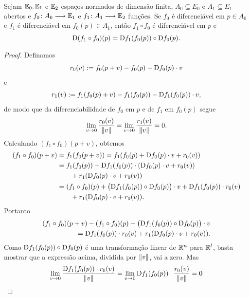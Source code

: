 \begin{prop}
Sejam $\mathbb{E}_0, \mathbb{E}_1$ e $\mathbb{E}_2$ espaços normados de dimensão finita, $A_0 \subseteq E_0$ e $A_1 \subseteq E_1$ abertos e $f_0\colon A_0 \longrightarrow \mathbb{E}_1$ e $f_1\colon A_1 \longrightarrow \mathbb{E}_2$ funções. Se $f_0$ é diferenciável em $p \in A_0$ e $f_1$ é diferenciável em $f_0(p) \in A_1$, então $f_1 \circ f_0$ é diferenciável em $p$ e
	\begin{equation*}
	\mathrm{D} (f_1 \circ f_0)(p) = \mathrm{D} f_1(f_0(p)) \circ \mathrm{D} f_0(p).
	\end{equation*}
\end{prop}
\begin{proof} Definamos
	\begin{equation*}
	r_0(v) := f_0(p+v) - f_0(p) - \mathrm{D} f_0(p) \cdot v
	\end{equation*}
e
	\begin{equation*}
	r_1(v) := f_1(f_0(p)+v) - f_1(f_0(p)) - \mathrm{D} f_1(f_0(p)) \cdot v,
	\end{equation*}
de modo que da diferenciabilidade de $f_0$ em $p$ e de $f_1$ em $f_0(p)$ segue
	\begin{equation*}
	\lim_{v \rightarrow 0} \frac{r_0(v)}{\left\Vert{v}\right\Vert} = \lim_{v \rightarrow 0} \frac{r_1(v)}{\left\Vert{v}\right\Vert} = 0.
	\end{equation*}	
Calculando $(f_1 \circ f_0)(p+v)$, obtemos
	\begin{align*}
	(f_1 \circ f_0)(p+v) &= f_1(f_0(p+v)) = f_1(f_0(p)+\mathrm{D} f_0(p) \cdot v + r_0(v)) \\
		&= f_1(f_0(p)) + \mathrm{D} f_1(f_0(p)) \cdot (\mathrm{D} f_0(p) \cdot v + r_0(v)) \\
		&\qquad + r_1(\mathrm{D} f_0(p) \cdot v + r_0(v)) \\
		&= (f_1 \circ f_0)(p) + \big(\mathrm{D} f_1(f_0(p)) \circ \mathrm{D} f_0(p)\big) \cdot v + \mathrm{D} f_1(f_0(p)) \cdot r_0(v) \\
		&\qquad + r_1(\mathrm{D} f_0(p) \cdot v + r_0(v)).
	\end{align*}
Portanto
	\begin{align*}
	(f_1 \circ f_0)(p+v) - (f_1 \circ f_0)(p) - \big(\mathrm{D} f_1(f_0(p)) \circ \mathrm{D} f_0(p)\big) \cdot v \\
	\qquad = \mathrm{D} f_1(f_0(p)) \cdot r_0(v) + r_1(\mathrm{D} f_0(p) \cdot v + r_0(v)).
	\end{align*}
Como $\mathrm{D} f_1(f_0(p)) \circ \mathrm{D} f_0(p)$ é uma transformação linear de $\mathbb{R}^n$ para $\mathbb{R}^l$, basta mostrar que a expressão acima, dividida por $\left\Vert{v}\right\Vert$, vai a zero. Mas
	\begin{equation*}
	\lim_{v \conv 0} \frac{\D f_1(f_0(p)) \cdot r_0(v)}{\nor{v}} = \lim_{v \conv 0} \D f_1(f_0(p)) \cdot \frac{r_0(v)}{\nor{v}} = 0

\end{equation*}
\end{proof}
